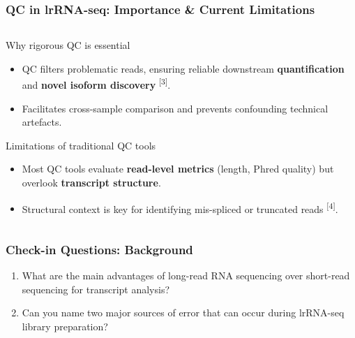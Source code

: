 \documentclass[aspectratio=169]{beamer}
\begin{document}
\begin{frame}
  \frametitle{QC in lrRNA-seq: Importance \& Current Limitations}
  \begin{columns}[T]
    \begin{column}{0.9\textwidth}
      \begin{block}{Why rigorous QC is essential}
        \begin{itemize}
          \item QC filters problematic reads, ensuring reliable downstream \textbf{quantification} and \textbf{novel isoform discovery} \textsuperscript{[3]}.
          \item Facilitates cross-sample comparison and prevents confounding technical artefacts.
        \end{itemize}
      \end{block}
      \vspace{0.4cm}
      \begin{block}{Limitations of traditional QC tools}
        \begin{itemize}
          \item Most QC tools evaluate \textbf{read-level metrics} (length, Phred quality) but overlook \textbf{transcript structure}. 
          \item Structural context is key for identifying mis-spliced or truncated reads \textsuperscript{[4]}.
        \end{itemize}
      \end{block}
    \end{column}
  \end{columns}
\end{frame}

\begin{frame}
  \frametitle{Check-in Questions: Background}
  \begin{enumerate}
    \item What are the main advantages of long-read RNA sequencing over short-read sequencing for transcript analysis?
    \vspace{0.5cm}
    \item Can you name two major sources of error that can occur during lrRNA-seq library preparation?
  \end{enumerate}
\end{frame}

\end{document}
